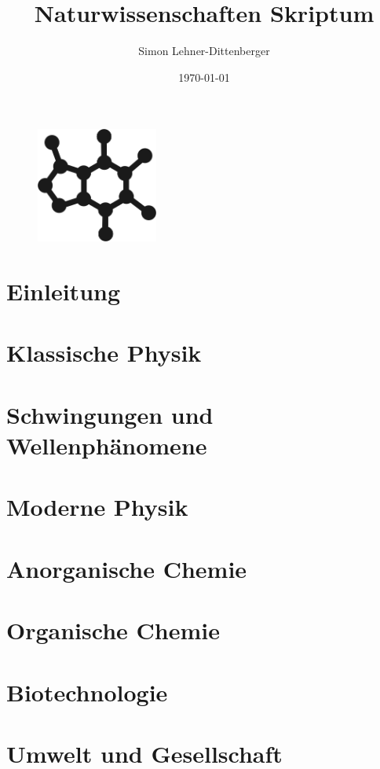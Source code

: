 \documentclass{article}
\title{Naturwissenschaften Skriptum}
\author{Simon Lehner-Dittenberger}
\date{ \today }
\begin{document}
\maketitle
\begin{figure}[bh]
\centering
\includegraphics[width=4cm]{caffeine.png}
\end{figure}
\newpage

\tableofcontents 
\newpage

 
\section{Einleitung}

\newpage
 
\section{Klassische Physik}

\newpage

\section{Schwingungen und Wellenphänomene}

\newpage

\section{Moderne Physik}

\newpage

\section{Anorganische Chemie}

\newpage

\section{Organische Chemie}

\newpage

\section{Biotechnologie}

\newpage

\section{Umwelt und Gesellschaft}
 
\newpage
 
\end{document}
